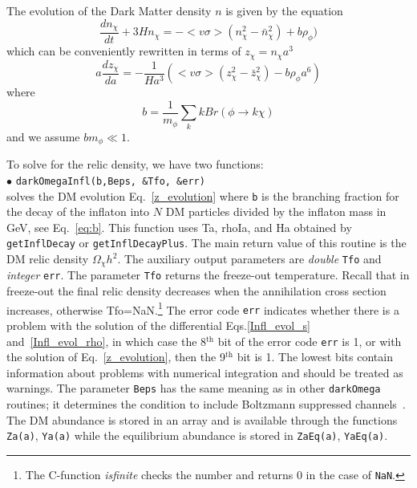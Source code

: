 \documentclass[12pt,a4paper]{article}
\begin{document}
The evolution of the Dark Matter density $n$  is given   by the equation 
\begin{equation}
   \frac{dn_\chi}{dt}+3H n_\chi =-<v\sigma>(n_\chi^2-\bar{n}^2_\chi) + b \rho_\phi)
\end{equation}
which can be  conveniently rewritten in terms of $z_\chi=n_\chi a^3$
\begin{equation} 
\label{z_evolution}
  a\frac{d z_\chi}{d a}=-\frac{1}{H a^3}(<v\sigma>(z^2_\chi -\bar{z}^2_\chi) - b \rho_\phi a^6)
\end{equation}
where 
\begin{equation}
\label{eq:b}
b=\frac{1}{m_\phi} \sum_k k Br(\phi\to k \chi)
\end{equation}
and we assume  $ b m_\phi \ll 1$.


To solve for the relic density, we have two functions:\\
\noindent $\bullet$ \verb|darkOmegaInfl(b,Beps, &Tfo, &err) |\\
solves the DM evolution Eq.~\eqref{z_evolution} where {\tt b} is the branching fraction for the decay of the  inflaton into $N$ DM particles divided by  the inflaton mass in GeV, see Eq.~\eqref{eq:b}. This function  uses Ta, rhoIa, and Ha obtained by \verb|getInflDecay| or \verb|getInflDecayPlus|. The main return value of this routine is the DM relic density $\Omega_\chi h^2$. The auxiliary output parameters are {\it double } {\tt Tfo} and {\it integer} {\tt err}. The parameter {\tt Tfo}  returns the freeze-out temperature. Recall that in freeze-out the final relic density decreases when the annihilation cross section  increases, otherwise Tfo=NaN.\footnote{The C-function {\it isfinite} checks the number and returns 0 in the case of {\tt NaN}.} The error code {\tt err} indicates whether there is a problem with the solution of the differential Eqs.\eqref{Infl_evol_s} 
and~\eqref{Infl_evol_rho}, in which case the 8$^\text{th}$ bit of the error code {\tt err} is 1, or with the solution of Eq.~\eqref{z_evolution}, then the 9$^\text{th}$ bit is 1. The lowest bits contain information about problems with numerical integration and should be treated as warnings. The parameter \verb|Beps| has the same meaning as in other \verb|darkOmega| routines; it determines the condition to include Boltzmann suppressed channels~\cite{Belanger:2001fz}. The DM abundance is stored in an array and is available through the functions {\tt Za(a)}, \verb|Ya(a)| while the equilibrium abundance is stored in {\tt ZaEq(a)}, \verb|YaEq(a)|.\\
\end{document}
